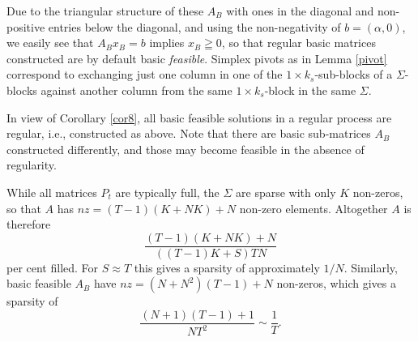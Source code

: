 \documentclass{article}
\theoremstyle{definition}
\numberwithin{equation}{section}
\begin{document}
Due to the triangular structure of these $A_B$ with ones in the diagonal and non-positive entries below the diagonal, and using the non-negativity of $b = (\alpha , 0)$,
we easily see that $A_B x_B = b$ implies $x_B \geqq 0$, so that regular basic matrices constructed 
are by default
basic {\it feasible}.
Simplex pivots as in Lemma \ref{pivot} correspond to exchanging just one column in one of the 
$1\times k_s$-sub-blocks of a
$\Sigma$-blocks against another column from the same $1 \times k_s$-block in the same $\Sigma$.



In view of Corollary \ref{cor8}, all basic feasible solutions in a regular process are regular, i.e.,  constructed as above. 
Note that there are basic sub-matrices
$A_B$ constructed differently, 
and those may become feasible in the absence of regularity.



While all matrices $P_t$ are typically full, the $\Sigma$ are sparse 
with only $K$ non-zeros, so that 
$A$ has $nz = (T-1)(K+NK)+N$ non-zero elements. Altogether
$A$ is therefore 
$$
\frac{(T-1)(K+NK)+N}{((T-1)K+S) TN}
$$ 
per cent filled. For $S\approx T$ this gives a sparsity of approximately $1/N$. Similarly,
basic feasible $A_B$ have $nz = (N+N^2)(T-1)+N$ non-zeros, which gives a sparsity of
$$
\frac{(N+1)(T-1)+1}{NT^2}\sim \frac{1}{T}.
$$






















\end{document}

